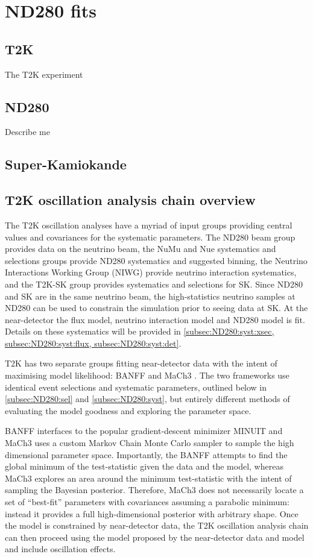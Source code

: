 \chapter{ND280 fits}
\label{chap:ND280}

\section{T2K}
The T2K experiment

\section{ND280}
Describe me

\section{Super-Kamiokande}

\section{T2K oscillation analysis chain overview}
\label{sec:oscchain}
The T2K oscillation analyses have a myriad of input groups providing central values and covariances for the systematic parameters. The ND280 beam group provides data on the neutrino beam, the NuMu and Nue systematics and selections groups provide ND280 systematics and suggested binning, the Neutrino Interactions Working Group (NIWG) provide neutrino interaction systematics, and the T2K-SK group provides systematics and selections for SK. Since ND280 and SK are in the same neutrino beam, the high-statistics neutrino samples at ND280 can be used to constrain the simulation prior to seeing data at SK. At the near-detector the flux model, neutrino interaction model and ND280 model is fit. Details on these systematics will be provided in \autoref{subsec:ND280:syst:xsec, subsec:ND280:syst:flux, subsec:ND280:syst:det}.

T2K has two separate groups fitting near-detector data with the intent of maximising model likelihood: BANFF  and MaCh3 . The two frameworks use identical event selections and systematic parameters, outlined below in \autoref{subsec:ND280:sel} and \autoref{subsec:ND280:syst}, but entirely different methods of evaluating the model goodness and exploring the parameter space.

BANFF interfaces to the popular gradient-descent minimizer MINUIT  and MaCh3 uses a custom Markov Chain Monte Carlo sampler to sample the high dimensional parameter space. Importantly, the BANFF attempts to find the global minimum of the test-statistic given the data and the model, whereas MaCh3 explores an area around the minimum test-statistic with the intent of sampling the Bayesian posterior. Therefore, MaCh3 does not necessarily locate a set of ``best-fit'' parameters with covariances assuming a parabolic minimum: instead it provides a full high-dimensional posterior with arbitrary shape. Once the model is constrained by near-detector data, the T2K oscillation analysis chain can then proceed using the model proposed by the near-detector data and model and include oscillation effects.

